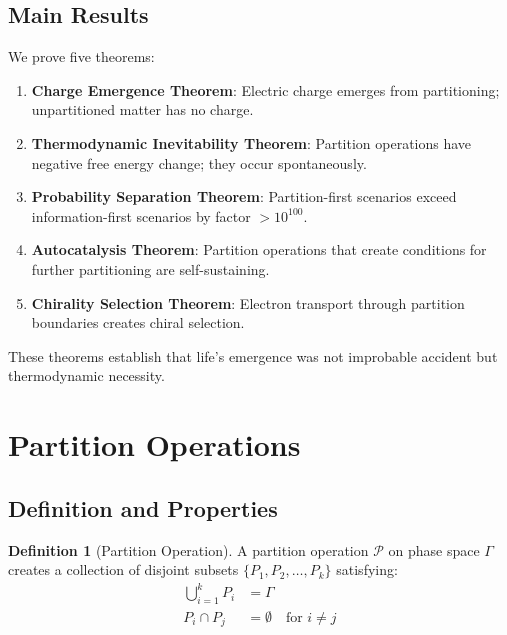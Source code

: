 \documentclass[twocolumn,10pt,a4paper]{article}
\theoremstyle{definition}
\newtheorem{definition}[theorem]{Definition}
\theoremstyle{remark}
\newcommand{\Partition}{\mathcal{P}}
\begin{document}
\subsection{Main Results}

We prove five theorems:

\begin{enumerate}
    \item \textbf{Charge Emergence Theorem}: Electric charge emerges from partitioning; unpartitioned matter has no charge.

    \item \textbf{Thermodynamic Inevitability Theorem}: Partition operations have negative free energy change; they occur spontaneously.

    \item \textbf{Probability Separation Theorem}: Partition-first scenarios exceed information-first scenarios by factor $> 10^{100}$.

    \item \textbf{Autocatalysis Theorem}: Partition operations that create conditions for further partitioning are self-sustaining.

    \item \textbf{Chirality Selection Theorem}: Electron transport through partition boundaries creates chiral selection.
\end{enumerate}

These theorems establish that life's emergence was not improbable accident but thermodynamic necessity.

\section{Partition Operations}
\label{sec:partition}

\subsection{Definition and Properties}

\begin{definition}[Partition Operation]
\label{def:partition}
A partition operation $\Partition$ on phase space $\Gamma$ creates a collection of disjoint subsets $\{P_1, P_2, \ldots, P_k\}$ satisfying:
\begin{align}
    \bigcup_{i=1}^{k} P_i &= \Gamma \\
    P_i \cap P_j &= \emptyset \quad \text{for } i \neq j
\end{align}
\end{definition}
\end{document}
